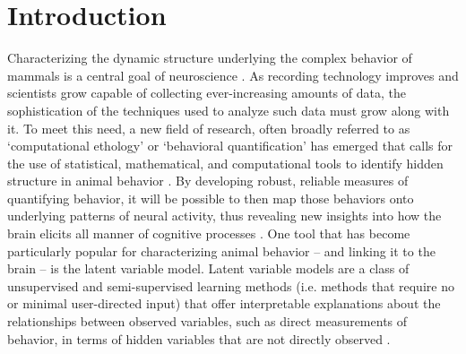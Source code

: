 \chapter{Introduction\label{ch:intro}}

Characterizing the dynamic structure underlying the complex behavior of mammals is a central goal of neuroscience \cite{gomez-marin_big_2014, krakauer_neuroscience_2017, niv_primacy_2021}. As recording technology improves and scientists grow capable of collecting ever-increasing amounts of data, the sophistication of the techniques used to analyze such data must grow along with it. To meet this need, a new field of research, often broadly referred to as `computational ethology' or `behavioral quantification' has emerged that calls for the use of statistical, mathematical, and computational tools to identify hidden structure in animal behavior \cite{anderson_toward_2014, egnor_computational_2016, brown_ethology_2018, berman_measuring_2018, mathis_deep_2020}. By developing robust, reliable measures of quantifying behavior, it will be possible to then map those behaviors onto underlying patterns of neural activity, thus revealing new insights into how the brain elicits all manner of cognitive processes \cite{datta_computational_2019, pereira_quantifying_2020}. One tool that has become particularly popular for characterizing animal behavior -- and linking it to the brain -- is the latent variable model. Latent variable models are a class of unsupervised and semi-supervised learning methods (i.e. methods that require no or minimal user-directed input) that offer interpretable explanations about the relationships between observed variables, such as direct measurements of behavior, in terms of hidden variables that are not directly observed \cite{muthen_beyond_2002, skrondal_latent_2007, everett_introduction_2013}. 

